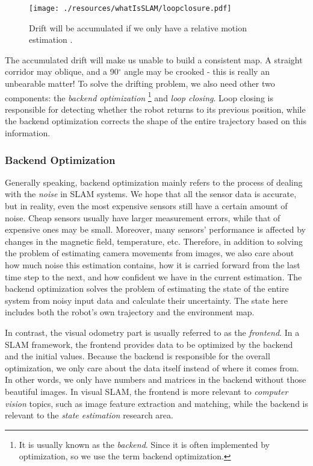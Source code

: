 \begin{figure}
    \centering
    \texttt{[image: ./resources/whatIsSLAM/loopclosure.pdf]}
    \caption{Drift will be accumulated if we only have a relative motion estimation \cite{Ho2007}.}
    \label{fig:loopclosure}
\end{figure}

The accumulated drift will make us unable to build a consistent map. A straight corridor may oblique, and a 90$^\circ$ angle may be crooked - this is really an unbearable matter! To solve the drifting problem, we also need other two components: the \textit{backend optimization} \footnote{It is usually known as the \textit{backend}. Since it is often implemented by optimization, so we use the term backend optimization.} and \textit{loop closing}. Loop closing is responsible for detecting whether the robot returns to its previous position, while the backend optimization corrects the shape of the entire trajectory based on this information.

\subsubsection{Backend Optimization}
Generally speaking, backend optimization mainly refers to the process of dealing with the \emph{noise} in SLAM systems. We hope that all the sensor data is accurate, but in reality, even the most expensive sensors still have a certain amount of noise. Cheap sensors usually have larger measurement errors, while that of expensive ones may be small. Moreover, many sensors' performance is affected by changes in the magnetic field, temperature, etc. Therefore, in addition to solving the problem of estimating camera movements from images, we also care about how much noise this estimation contains, how it is carried forward from the last time step to the next, and how confident we have in the current estimation. The backend optimization solves the problem of estimating the state of the entire system from noisy input data and calculate their uncertainty. The state here includes both the robot's own trajectory and the environment map.

In contrast, the visual odometry part is usually referred to as the \textit{frontend}. In a SLAM framework, the frontend provides data to be optimized by the backend and the initial values. Because the backend is responsible for the overall optimization, we only care about the data itself instead of where it comes from. In other words, we only have numbers and matrices in the backend without those beautiful images. In visual SLAM, the frontend is more relevant to \textit{computer vision} topics, such as image feature extraction and matching, while the backend is relevant to the \textit{state estimation} research area.

